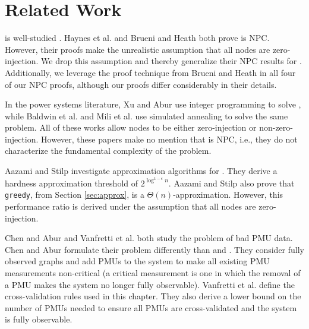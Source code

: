 \section{Related Work}
\label{sec:related-pmu}

\full is well-studied \cite{Baldwin93,Brueni05,Haynes02, Mili90, Xu04}.  
Haynes et al. \cite{Haynes02} and Brueni and Heath \cite{Brueni05} both prove \full is NPC.  
However, their proofs make the unrealistic assumption that all nodes are zero-injection.  We drop this assumption and thereby generalize their NPC results for \fulls.
Additionally, we leverage the proof technique from Brueni and Heath \cite{Brueni05} in all four of our NPC proofs, although our proofs
differ considerably in their details. 

In the power systems literature, Xu and Abur \cite{Xu04,Xu05} use integer programming to solve \fulls, while Baldwin et al. \cite{Baldwin93} and Mili et al. \cite{Mili90} use simulated annealing 
to solve the same problem. All of these works allow nodes to be either zero-injection or non-zero-injection.  However,
these papers make no mention that \full is NPC, i.e., they do not characterize the fundamental complexity of the problem. 

Aazami and Stilp \cite{Aazami07} investigate approximation algorithms for \fulls.  They derive a hardness approximation threshold of $2^{\log^{1 -\epsilon}n}$.
Aazami and Stilp also prove that {\tt greedy}, from Section \ref{sec:approx}, is a $\Theta(n)$-approximation. 
However, this performance ratio is derived under the assumption that all nodes are zero-injection.

Chen and Abur \cite{Abur06} and Vanfretti et al. \cite{Vanfretti10} both study the problem of bad PMU data. Chen and Abur \cite{Abur06} formulate their problem differently than \xval and \xvalparts.  
They consider fully observed graphs and add PMUs to the system to make all existing PMU measurements non-critical 
(a critical measurement is one in which the removal of a PMU makes the system
no longer fully observable). Vanfretti et al. \cite{Vanfretti10} define the cross-validation rules used in this chapter.  They also derive a
lower bound on the number of PMUs needed to ensure all PMUs are cross-validated and the system is fully observable. 

